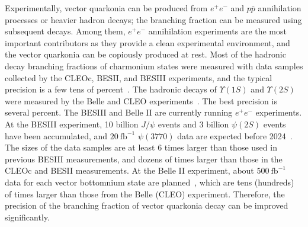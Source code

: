 \documentclass[%
preprint,
 amsmath,amssymb,
 aps,
]{revtex4-2}
\newcommand{\EE}{e^+e^-}
\newcommand{\psip}{\psi(2S)}
\newcommand{\psipp}{\psi(3770)}
\newcommand{\jpsi}{J/\psi}
\newcommand{\upsi}{\Upsilon(1S)}
\newcommand{\upsip}{\Upsilon(2S)}
\newcommand{\invfb}{\mathrm{fb}^{-1}}
\begin{document}
Experimentally, vector quarkonia can be produced from $\EE$ and $p\bar{p}$ 
annihilation processes or heavier hadron decays; the branching fraction can be 
measured using subsequent decays. Among them, $\EE$ annihilation experiments 
are the most important contributors as they provide a clean experimental environment, 
and the vector quarkonia can be copiously produced at rest. Most of the hadronic 
decay branching fractions of charmonium states were measured with data samples 
collected by the CLEOc, BESII, and BESIII experiments, and the typical precision is 
a few tens of percent~\cite{pdg2008}. The hadronic decays of $\upsi$ and $\upsip$ 
were measured by the Belle and CLEO experiments~\cite{pdg2020}.
The best precision is several percent. The BESIII and Belle II are currently running 
$\EE$ experiments. At the BESIII experiment, 10 billion $\jpsi$ events and 3 billion $\psip$ 
events have been accumulated,  and $20~\invfb$ $\psipp$ data are expected before 
2024~\cite{bes3-whitepaper}. The sizes of the data samples are at least 6 times larger 
than those used in previous BESIII measurements,  and dozens of times larger than 
those in the CLEOc and BESII measurements. At the Belle II experiment,  about $500~\invfb$ 
data for each vector bottomnium state are planned~\cite{belleII-physics}, which are 
tens (hundreds) of times larger than those from the Belle (CLEO) experiment.
Therefore, the precision of the branching fraction of vector quarkonia decay 
can be improved significantly.
\end{document}
